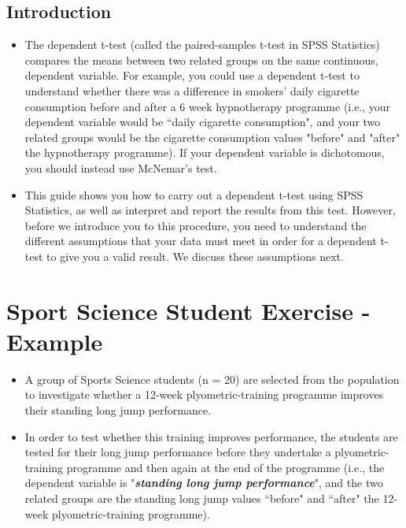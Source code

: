 \documentclass[]{article}
\begin{document}
	
	\newpage
	\subsection*{Introduction}
\begin{itemize}
	\item 	The dependent t-test (called the paired-samples t-test in SPSS Statistics) compares the means between two related groups on the same continuous, dependent variable. For example, you could use a dependent t-test to understand whether there was a difference in smokers' daily cigarette consumption before and after a 6 week hypnotherapy programme (i.e., your dependent variable would be ``daily cigarette consumption", and your two related groups would be the cigarette consumption values "before" and "after" the hypnotherapy programme). If your dependent variable is dichotomous, you should instead use McNemar's test.
	
\item This guide shows you how to carry out a dependent t-test using SPSS Statistics, as well as interpret and report the results from this test. However, before we introduce you to this procedure, you need to understand the different assumptions that your data must meet in order for a dependent t-test to give you a valid result. We discuss these assumptions next.
\end{itemize}

	

\section{Sport Science Student Exercise - Example}
\begin{itemize}
	\item A group of Sports Science students (n = 20) are selected from the population to investigate whether a 12-week plyometric-training programme improves their standing long jump performance.
	\item  In order to test whether this training improves performance, the students are tested for their long jump performance before they undertake a plyometric-training programme and then again at the end of the programme (i.e., the dependent variable is "\textbf{\textit{standing long jump performance}}", and the two related groups are the standing long jump values ``before" and ``after" the 12-week plyometric-training programme).
	
\end{itemize}
\end{document}
